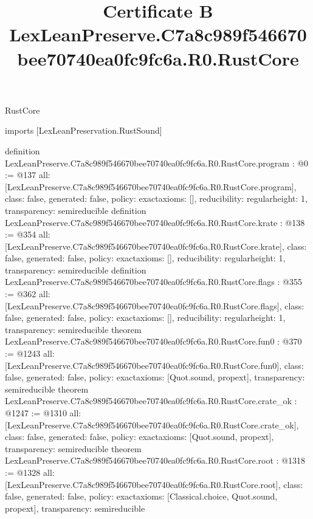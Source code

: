 \begin{lexlean}{RustCore}
\title{Certificate B LexLeanPreserve.C7a8c989f546670bee70740ea0fc9fc6a.R0.RustCore}
\begin{coremodule}
imports [LexLeanPreservation.RustSound]

definition LexLeanPreserve.C7a8c989f546670bee70740ea0fc9fc6a.R0.RustCore.program : @0 := @137 {
  all: [LexLeanPreserve.C7a8c989f546670bee70740ea0fc9fc6a.R0.RustCore.program],
  class: false,
  generated: false,
  policy: exact{axioms: []},
  reducibility: regular{height: 1},
  transparency: semireducible
}
definition LexLeanPreserve.C7a8c989f546670bee70740ea0fc9fc6a.R0.RustCore.krate : @138 := @354 {
  all: [LexLeanPreserve.C7a8c989f546670bee70740ea0fc9fc6a.R0.RustCore.krate],
  class: false,
  generated: false,
  policy: exact{axioms: []},
  reducibility: regular{height: 1},
  transparency: semireducible
}
definition LexLeanPreserve.C7a8c989f546670bee70740ea0fc9fc6a.R0.RustCore.flags : @355 := @362 {
  all: [LexLeanPreserve.C7a8c989f546670bee70740ea0fc9fc6a.R0.RustCore.flags],
  class: false,
  generated: false,
  policy: exact{axioms: []},
  reducibility: regular{height: 1},
  transparency: semireducible
}
theorem LexLeanPreserve.C7a8c989f546670bee70740ea0fc9fc6a.R0.RustCore.fun0 : @370 := @1243 {
  all: [LexLeanPreserve.C7a8c989f546670bee70740ea0fc9fc6a.R0.RustCore.fun0],
  class: false,
  generated: false,
  policy: exact{axioms: [Quot.sound, propext]},
  transparency: semireducible
}
theorem LexLeanPreserve.C7a8c989f546670bee70740ea0fc9fc6a.R0.RustCore.crate_ok : @1247 := @1310 {
  all: [LexLeanPreserve.C7a8c989f546670bee70740ea0fc9fc6a.R0.RustCore.crate_ok],
  class: false,
  generated: false,
  policy: exact{axioms: [Quot.sound, propext]},
  transparency: semireducible
}
theorem LexLeanPreserve.C7a8c989f546670bee70740ea0fc9fc6a.R0.RustCore.root : @1318 := @1328 {
  all: [LexLeanPreserve.C7a8c989f546670bee70740ea0fc9fc6a.R0.RustCore.root],
  class: false,
  generated: false,
  policy: exact{axioms: [Classical.choice, Quot.sound, propext]},
  transparency: semireducible
}


\end{coremodule}
\end{lexlean}
